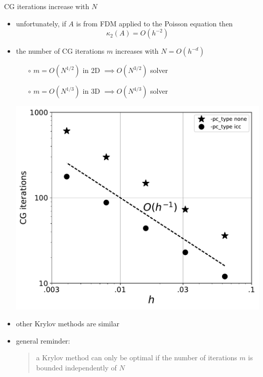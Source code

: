\documentclass[hide notes,intlimits,usenames,dvipsnames]{beamer}
\begin{document}
\begin{frame}{CG iterations increase with $N$}

\begin{itemize}
\item unfortunately, if $A$ is from FDM applied to the Poisson equation then
    $$\kappa_2(A) = O(h^{-2})$$
\item \begin{minipage}[t]{55mm}
the number of CG iterations $m$ increases with $N=O(h^{-d})$
	\begin{itemize}
	\item[$\circ$] $m=O(N^{1/2})$ in 2D $\implies O(N^{3/2})$ solver
	\item[$\circ$] $m=O(N^{1/3})$ in 3D $\implies O(N^{4/3})$ solver
	\end{itemize}
\end{minipage} \quad
\begin{minipage}[t]{40mm}
\vspace{-2mm}

\includegraphics[width=\textwidth]{figs/poisson-cg-scale}
\end{minipage}

\vspace{-2mm}
\item other Krylov methods are similar

\vspace{5mm}
\item general reminder:

\begin{quote}
\alert{a Krylov method can only be optimal if the number of iterations $m$ is bounded independently of $N$}
\end{quote}
\end{itemize}
\end{frame}
\end{document}
